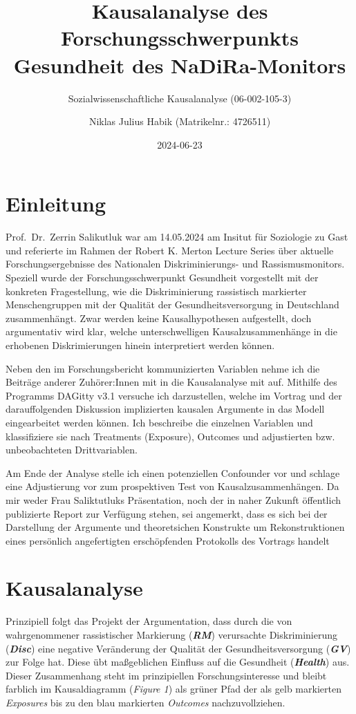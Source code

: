 \documentclass[
  11pt,
  oneside]{article}
\title{Kausalanalyse des Forschungsschwerpunkts Gesundheit des
NaDiRa-Monitors}
\subtitle{Sozialwissenschaftliche Kausalanalyse (06-002-105-3)}
\author{Niklas Julius Habik (Matrikelnr.: 4726511)}
\date{2024-06-23}
\begin{document}
\maketitle

\hypertarget{einleitung}{%
\section{Einleitung}\label{einleitung}}

Prof.~Dr.~Zerrin Salikutluk war am 14.05.2024 am Insitut für Soziologie
zu Gast und referierte im Rahmen der Robert K. Merton Lecture Series
über aktuelle Forschungsergebnisse des Nationalen Diskriminierungs- und
Rassismusmonitors. Speziell wurde der Forschungsschwerpunkt Gesundheit
vorgestellt mit der konkreten Fragestellung, wie die Diskriminierung
rassistisch markierter Menschengruppen mit der Qualität der
Gesundheitsversorgung in Deutschland zusammenhängt. Zwar werden keine
Kausalhypothesen aufgestellt, doch argumentativ wird klar, welche
unterschwelligen Kausalzusammenhänge in die erhobenen Diskrimierungen
hinein interpretiert werden können.

Neben den im Forschungsbericht kommunizierten Variablen nehme ich die
Beiträge anderer Zuhörer:Innen mit in die Kausalanalyse mit auf.
Mithilfe des Programms DAGitty v3.1 versuche ich darzustellen, welche im
Vortrag und der darauffolgenden Diskussion implizierten kausalen
Argumente in das Modell eingearbeitet werden können. Ich beschreibe die
einzelnen Variablen und klassifiziere sie nach Treatments (Exposure),
Outcomes und adjustierten bzw. unbeobachteten Drittvariablen.

Am Ende der Analyse stelle ich einen potenziellen Confounder vor und
schlage eine Adjustierung vor zum prospektiven Test von
Kausalzusammenhängen. Da mir weder Frau Saliktutluks Präsentation, noch
der in naher Zukunft öffentlich publizierte Report zur Verfügung stehen,
sei angemerkt, dass es sich bei der Darstellung der Argumente und
theoretsichen Konstrukte um Rekonstruktionen eines persönlich
angefertigten erschöpfenden Protokolls des Vortrags handelt

\hypertarget{kausalanalyse}{%
\section{Kausalanalyse}\label{kausalanalyse}}

Prinzipiell folgt das Projekt der Argumentation, dass durch die von
wahrgenommener rassistischer Markierung (\textbf{\emph{RM}}) verursachte
Diskriminierung (\textbf{\emph{Disc}}) eine negative Veränderung der
Qualität der Gesundheitsversorgung (\textbf{\emph{GV}}) zur Folge hat.
Diese übt maßgeblichen Einfluss auf die Gesundheit
(\textbf{\emph{Health}}) aus. Dieser Zusammenhang steht im prinzipiellen
Forschungsinteresse und bleibt farblich im Kausaldiagramm (\emph{Figure
1}) als grüner Pfad der als gelb markierten \emph{Exposures} bis zu den
blau markierten \emph{Outcomes} nachzuvollziehen.
\end{document}
